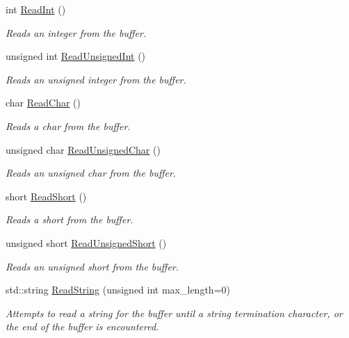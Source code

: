 \begin{DoxyCompactItemize}
int \hyperlink{class_senergy_1_1_byte_buffer_ab15f04d43dd82cebf6dc25254d210e4e}{Read\-Int} ()
\begin{DoxyCompactList}\small\item\em Reads an integer from the buffer. \end{DoxyCompactList}\item 
unsigned int \hyperlink{class_senergy_1_1_byte_buffer_a7abe5475b2a9adcad384d3125640aba2}{Read\-Unsigned\-Int} ()
\begin{DoxyCompactList}\small\item\em Reads an unsigned integer from the buffer. \end{DoxyCompactList}\item 
char \hyperlink{class_senergy_1_1_byte_buffer_a806db1b33ff86b572a0804879d181dc8}{Read\-Char} ()
\begin{DoxyCompactList}\small\item\em Reads a char from the buffer. \end{DoxyCompactList}\item 
unsigned char \hyperlink{class_senergy_1_1_byte_buffer_ad9a7a05b0285fe070cde3983458de5f6}{Read\-Unsigned\-Char} ()
\begin{DoxyCompactList}\small\item\em Reads an unsigned char from the buffer. \end{DoxyCompactList}\item 
short \hyperlink{class_senergy_1_1_byte_buffer_a989443842e20c2feba4268e968911fe8}{Read\-Short} ()
\begin{DoxyCompactList}\small\item\em Reads a short from the buffer. \end{DoxyCompactList}\item 
unsigned short \hyperlink{class_senergy_1_1_byte_buffer_aa6b6bfdb398a75b92c79bcdfc1986821}{Read\-Unsigned\-Short} ()
\begin{DoxyCompactList}\small\item\em Reads an unsigned short from the buffer. \end{DoxyCompactList}\item 
std\-::string \hyperlink{class_senergy_1_1_byte_buffer_ab1f14bdb0b09b2144d1775fa2dff95a6}{Read\-String} (unsigned int max\-\_\-length=0)
\begin{DoxyCompactList}\small\item\em Attempts to read a string for the buffer until a string termination character, or the end of the buffer is encountered. \end{DoxyCompactList}\item 

\end{DoxyCompactItemize}
